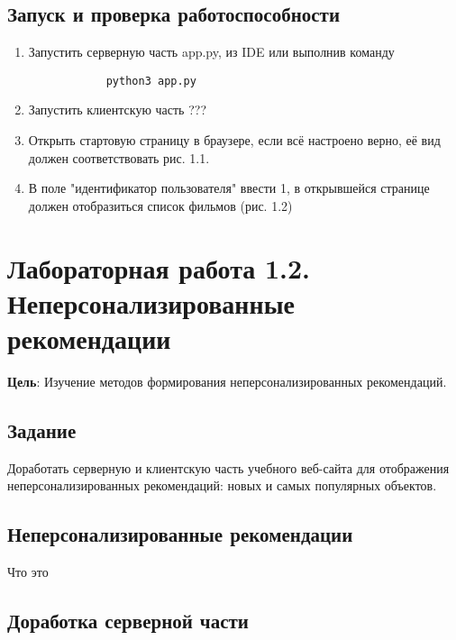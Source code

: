 \documentclass[a4paper,12pt]{report} %
\begin{document}
    \section{Запуск и проверка работоспособности}
    \begin{enumerate}
    	\item Запустить серверную часть app.py, из IDE или выполнив команду 
    	\begin{verbatim}
    		python3 app.py
    	\end{verbatim} 
        \item Запустить клиентскую часть ???
        \item Открыть стартовую страницу в браузере, если всё настроено верно, её вид должен соответствовать рис. 1.1.
        \item В поле "идентификатор пользователя" ввести 1, в открывшейся странице должен отобразиться список фильмов (рис. 1.2)
        
    \end{enumerate}

    \chapter {Лабораторная работа 1.2. Неперсонализированные рекомендации}
    \textbf{Цель}: Изучение методов формирования неперсонализированных рекомендаций.
    
    \section{Задание}
    Доработать серверную и клиентскую часть учебного веб-сайта для отображения неперсонализированных рекомендаций: новых и самых популярных объектов.
    
    \section{Неперсонализированные рекомендации}
    Что это
    
    \section{Доработка серверной части}
    
	
\end{document}
